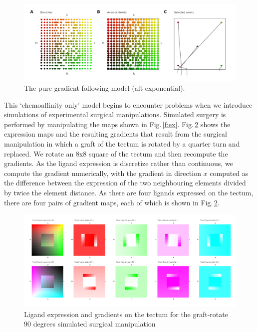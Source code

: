 \documentclass[11pt, a4paper]{article}
\begin{document}
\begin{figure}
\includegraphics[width=\linewidth]{./images/j4_eE_G_wt_fig3.png}
\caption{The pure gradient-following model (alt exponential).}
\label{f:chalt}
\end{figure}

This `chemoaffinity only' model begins to encounter problems when we introduce
simulations of experimental surgical manipulations. Simulated surgery is
performed by manipulating the maps shown in
Fig.\,\ref{f:ex}. Fig.\,\ref{f:trot90} shows the expression maps and the
resulting gradients that result from the surgical manipulation in which a
graft of the tectum is rotated by a quarter turn and replaced. We rotate an
8x8 square of the tectum and then recompute the gradients. As the ligand
expression is discretize rather than continuous, we compute the gradient
numerically, with the gradient in direction $x$ computed as the difference
between the expression of the two neighbouring elements divided by twice the
element distance. As there are four ligands expressed on the tectum, there are
four pairs of gradient maps, each of which is shown in Fig.\,\ref{f:trot90}.

%
\begin{figure}
\includegraphics[width=\linewidth]{./images/Tissuevisb.png}
\caption{Ligand expression and gradients on the tectum for the
graft-rotate 90 degrees simulated surgical manipulation}
\label{f:trot90}
\end{figure}
\end{document}
